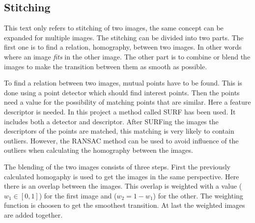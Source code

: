 \subsection{Stitching}
This text only refers to stitching of two images, the same concept can be expanded for multiple images. The stitching can be divided into two parts. The first one is to find a relation, homography, between two images. In other words where an image {\it fits} in the other image. The other part is to combine or blend the images to make the transition between them as smooth as possible.

To find a relation between two images, mutual points have to be found. This is done using a point detector which should find interest points. Then the points need a value for the possibility of matching points that are similar. Here a feature descriptor is needed. In this project a method called SURF has been used. It includes both a detector and descriptor. After SURFing the images the descriptors of the points are matched, this matching is very likely to contain outliers. However, the RANSAC method can be used to avoid influence of the outliers when calculating the homography between the images.

The blending of the two images consists of three steps. First the previously calculated homogaphy is used to get the images in the same perspective. Here there is an overlap between the images. This overlap is weighted with a value ($w_1 \in [0, 1]$) for the first image and ($w_2 = 1 - w_1$) for the other. The weighting function is choosen to get the smoothest transition. At last the weighted images are added together.

